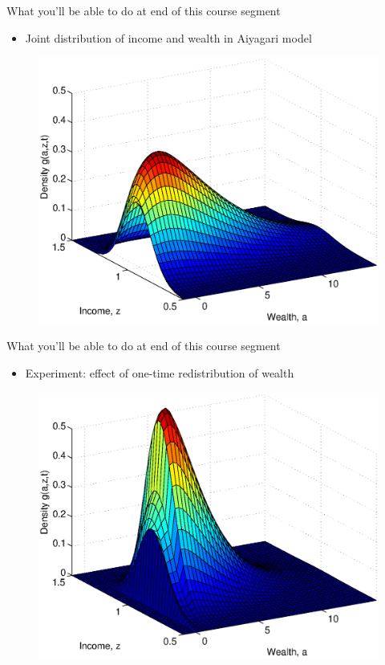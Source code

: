 \documentclass[11pt, aspectratio=169]{beamer}
\begin{document}
\begin{frame}{What you'll be able to do at end of this course segment}
	\begin{itemize}
		\item Joint distribution of income and wealth in Aiyagari model
	\end{itemize}
	\begin{figure}[h]
		\centering
		\includegraphics[width=.6\textwidth]{./figures/density_steadystate.eps}
	\end{figure}
\end{frame}


\begin{frame}{What you'll be able to do at end of this course segment}
	\begin{itemize}
		\item Experiment: effect of one-time redistribution of wealth
	\end{itemize}
	\begin{figure}[h]
		\centering
		\includegraphics[width=.6\textwidth]{./figures/density_initial.eps}
	\end{figure}
\end{frame}
\end{document}
